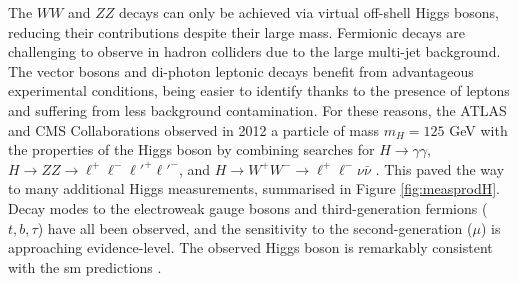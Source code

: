 The $WW$ and $ZZ$ decays can only be achieved via virtual off-shell Higgs bosons, reducing their contributions despite their large mass. Fermionic decays are challenging to observe in hadron colliders due to the large multi-jet background. The vector bosons and di-photon leptonic decays benefit from advantageous experimental conditions, being easier to identify thanks to the presence of leptons and suffering from less background contamination. For these reasons, the ATLAS and CMS Collaborations observed in 2012 a particle of mass $m_H = 125$ GeV with the properties of the Higgs boson by combining searches for $H \rightarrow \gamma\gamma$, $H \rightarrow ZZ \rightarrow \ell^+\ell^-\ell'^+\ell'^-$, and $H \rightarrow W^+W^- \rightarrow \ell^+\ell^-\nu \bar{\nu}$ \cite{ATLAS:2012yve, CMS:2012qbp}. This paved the way to many additional Higgs measurements, summarised in Figure \ref{fig:measprodH}. Decay modes to the electroweak gauge bosons and third-generation fermions ($t, b, \tau$) have all been observed, and the sensitivity to the second-generation ($\mu$) is approaching evidence-level. The observed Higgs boson is remarkably consistent with the \gls{sm} predictions \cite{ATLAS:2022vkf}. 